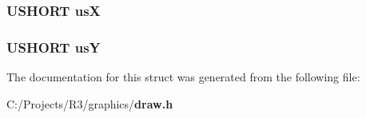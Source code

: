 \subsubsection[{usX}]{\setlength{\rightskip}{0pt plus 5cm}USHORT {\bf usX}}\label{struct_d_r_a_w___t_e_x_t___s_t_r_u_c_t_a6ead387c0c38c4f3f98aac147733a602}
\subsubsection[{usY}]{\setlength{\rightskip}{0pt plus 5cm}USHORT {\bf usY}}\label{struct_d_r_a_w___t_e_x_t___s_t_r_u_c_t_aeb96aa8e26a2ce680ec0e55e40f33a44}


The documentation for this struct was generated from the following file:\begin{DoxyCompactItemize}
\item 
C:/Projects/R3/graphics/{\bf draw.h}\end{DoxyCompactItemize}
